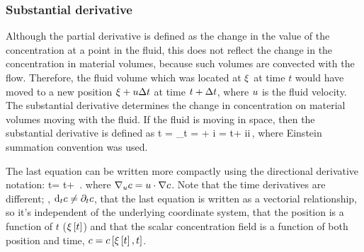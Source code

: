 \subsubsection{Substantial derivative}
Although the partial derivative is defined as the change in the value of the concentration at a point in the fluid, this does not reflect the change in the concentration in material volumes, because such volumes are convected with the flow. Therefore, the fluid volume which was located at $\xi$ at time $t$ would have moved to a new position $\xi + u\Delta t$ at time $t + \Delta t$, where $u$ is the fluid velocity. The substantial derivative determines the change in concentration on material volumes moving with the fluid. If the fluid is moving in space, then the substantial derivative is defined as
\beq
\xod\conc t = \lim_{\Dx t}
            =  + \fvec\vel i
            = \ipd t\conc + \fvec\vel i\ipd i\conc\,,
\eeq
where Einstein summation convention was used.

The last equation can be written more compactly using the directional derivative notation:
\beq
\iod t\conc = \ipd t\conc + \dirdev\vel\conc\,.
\eeq
where $\nabla_{u}{c} = u\cdot\nabla c$. Note that the time derivatives are different; \ie, $\text{d}_{t}c \not =\partial_{t}c$, that the last equation is written as a vectorial relationship, so it's independent of the underlying coordinate system, that the position is a function of $t$ ($\xi\left[{t}\right]$) and that the scalar concentration field is a function of both position and time, $c = c\left[{\xi\left[{t}\right], t}\right]$.


